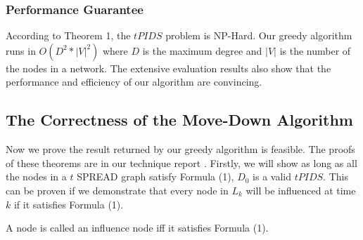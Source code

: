 \subsubsection*{Performance Guarantee}
According to Theorem 1, the $tPIDS$ problem is NP-Hard. Our greedy algorithm runs in $O(D^2*|V|^2)$ where $D$ is the maximum degree and $|V|$ is the number of the nodes in a network. The extensive evaluation results also show that the performance and efficiency of our algorithm are convincing.

\subsection{The Correctness of the Move-Down Algorithm}

Now we prove the result returned by our greedy algorithm is feasible. The proofs of these theorems are in our technique report\cite{ShiTech} .
Firstly, we will show as long as all the nodes in a $t$ SPREAD graph satisfy Formula (1), $D_0$ is a valid $tPIDS$.
This can be proven if we demonstrate that every node in $L_k$ will be influenced at time $k$ if it satisfies Formula (1).
\begin{theorem}
	A node is called an influence node iff it satisfies Formula (1).
\end{theorem}

